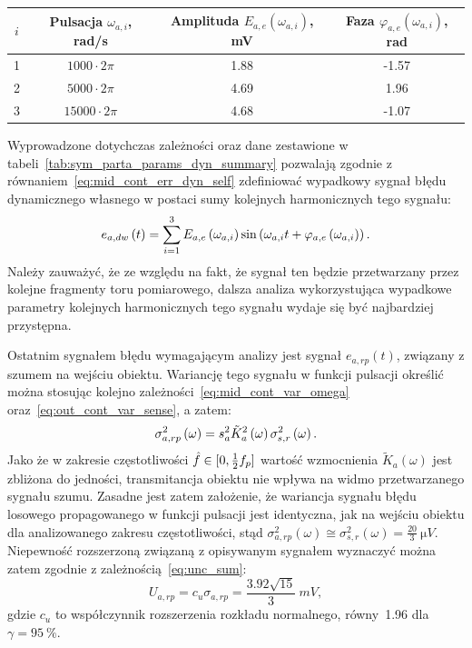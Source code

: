 \begin{table}[htb!]
\begin{tabular}[c]{| c | c | S[table-format = 1.2] | S[table-format = +1.2] |} \hline
\textbf{$i$} & \textbf{Pulsacja $\omega_{a,i}$, rad/s} & \textbf{Amplituda $E_{a,e}(\omega_{a,i})$, mV} & \textbf{Faza $\varphi_{a,e}(\omega_{a,i})$, rad} \\  & $1000  \cdot 2\pi$  &  1.88  & -1.57  \\  & $5000  \cdot 2\pi$  &  4.69  &  1.96  \\  & $15000 \cdot 2\pi$  &  4.68  & -1.07  \\ \hline
\end{tabular}
\end{table}

Wyprowadzone dotychczas zależności oraz dane zestawione w tabeli~\ref{tab:sym_parta_params_dyn_summary} pozwalają zgodnie z równaniem~\eqref{eq:mid_cont_err_dyn_self} zdefiniować wypadkowy sygnał błędu dynamicznego własnego w postaci sumy kolejnych harmonicznych tego sygnału:
\begin{equation}
e_{a,dw} \left(t\right) = \sum _{i=1} ^{3} E_{a,e} \left(\omega_{a,i}\right) \sin \left(\omega_{a,i} t + \varphi_{a,e} \left(\omega_{a,i}\right)\right) \label{eq:sym_parta_dyn_self_sum}.
\end{equation}
Należy zauważyć, że ze względu na fakt, że sygnał ten będzie przetwarzany przez kolejne fragmenty toru pomiarowego, dalsza analiza wykorzystująca wypadkowe parametry kolejnych harmonicznych tego sygnału wydaje się być najbardziej przystępna.

Ostatnim sygnałem błędu wymagającym analizy jest sygnał $e_{a,rp}(t)$, związany z szumem na wejściu obiektu. Wariancję tego sygnału w funkcji pulsacji określić można stosując kolejno zależności~\eqref{eq:mid_cont_var_omega} oraz~\eqref{eq:out_cont_var_sense}, a zatem:
\begin{equation}
\sigma_{a,rp}^{2} \left(\omega\right) = s_{a}^{2} \tilde{K}_{a}^{2} \left(\omega\right) \sigma_{s,r}^{2} \left(\omega\right) \label{eq:sym_parta_rand_prop_var_omega}.
\end{equation}
Jako że w zakresie częstotliwości $\hat{f} \in \interval{0}{\frac{1}{2} f_{p}}$ wartość wzmocnienia $\tilde{K}_{a}(\omega)$ jest zbliżona do jedności, transmitancja obiektu nie wpływa na widmo przetwarzanego sygnału szumu. Zasadne jest zatem założenie, że wariancja sygnału błędu losowego propagowanego w funkcji pulsacji jest identyczna, jak na wejściu obiektu dla analizowanego zakresu częstotliwości, stąd $\sigma_{a,rp}^{2}(\omega) \cong \sigma_{s,r}^{2}(\omega) = \frac{20}{3}~\unit{\micro V}$. Niepewność rozszerzoną związaną z opisywanym sygnałem wyznaczyć można zatem zgodnie z zależnością~\eqref{eq:unc_sum}:
\begin{equation}
U_{a,rp} = c_{u} \sigma_{a,rp} = \frac{\num{3.92} \sqrt{15}}{3}~\unit{mV} \label{eq:sym_parta_rand_prop_unc},
\end{equation}
gdzie $c_{u}$ to współczynnik rozszerzenia rozkładu normalnego, równy~\num{1.96} dla $\gamma = \qty{95}{\percent}$.

